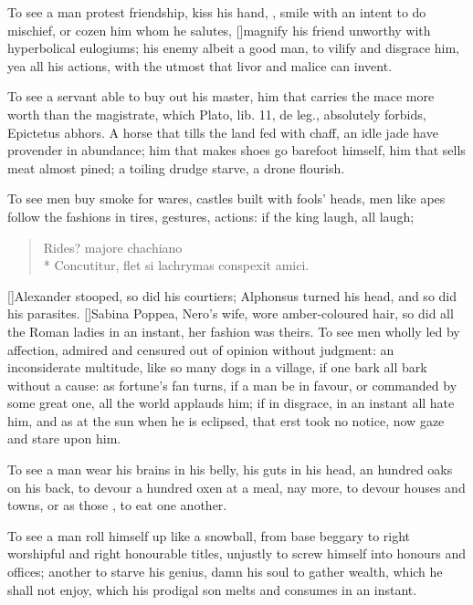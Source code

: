 {To see a man protest friendship, kiss his hand, , smile with an intent to do mischief, or cozen
him whom he salutes, [\baselineskip]magnify his friend unworthy with hyperbolical
eulogiums; his enemy albeit a good man, to vilify and disgrace him, yea
all his actions, with the utmost that livor and malice can invent.

To see a servant able to buy out his master, him that carries the
mace more worth than the magistrate, which Plato, lib. 11, de leg.,
absolutely forbids, Epictetus abhors. A horse that tills the land
fed with chaff, an idle jade have provender in abundance; him that
makes shoes go barefoot himself, him that sells meat almost pined; a
toiling drudge starve, a drone flourish.

To see men buy smoke for wares, castles built with fools' heads, men
like apes follow the fashions in tires, gestures, actions: if the king
laugh, all laugh;
%
\begin{latin}
\begin{verse}
Rides? majore chachiano\\*
Concutitur, flet si lachrymas conspexit amici.
\end{verse}
\end{latin}
%
%
[\baselineskip]Alexander stooped, so did his courtiers; Alphonsus turned his
head, and so did his parasites. [\baselineskip]Sabina Poppea, Nero's wife, wore
amber-coloured hair, so did all the Roman ladies in an instant, her
fashion was theirs.
%
To see men wholly led by affection, admired and censured out of opinion
without judgment: an inconsiderate multitude, like so many dogs in a
village, if one bark all bark without a cause: as fortune's fan turns,
if a man be in favour, or commanded by some great one, all the world
applauds him; if in disgrace, in an instant all hate him, and as
at the sun when he is eclipsed, that erst took no notice, now gaze and
stare upon him.

To see a man wear his brains in his belly, his guts in his head,
an hundred oaks on his back, to devour a hundred oxen at a meal, nay
more, to devour houses and towns, or as those , to
eat one another.

To see a man roll himself up like a snowball, from base beggary to
right worshipful and right honourable titles, unjustly to screw himself
into honours and offices; another to starve his genius, damn his soul
to gather wealth, which he shall not enjoy, which his prodigal son
melts and consumes in an instant. 

}
